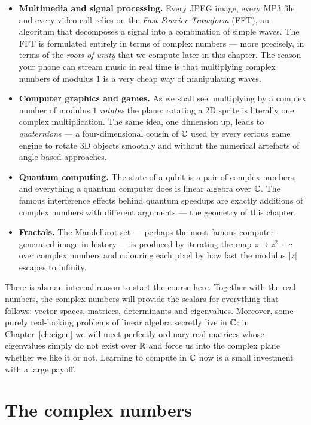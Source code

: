 \begin{itemize}
\item \textbf{Multimedia and signal processing.} Every JPEG image, every MP3 file and every video call
relies on the \emph{Fast Fourier Transform} (FFT), an algorithm that decomposes a signal into a
combination of simple waves. The FFT is formulated entirely in terms of complex numbers — more precisely,
in terms of the \emph{roots of unity} that we compute later in this chapter. The reason your phone
can stream music in real time is that multiplying complex numbers of modulus $1$ is a very cheap way of
manipulating waves.
\item \textbf{Computer graphics and games.} As we shall see, multiplying by a complex number of modulus
$1$ \emph{rotates} the plane: rotating a 2D sprite is literally one complex multiplication. The same idea,
one dimension up, leads to \emph{quaternions} — a four-dimensional cousin of $\mathbb{C}$ used by every serious
game engine to rotate 3D objects smoothly and without the numerical artefacts of angle-based approaches.
\item \textbf{Quantum computing.} The state of a qubit is a pair of complex numbers, and everything a
quantum computer does is linear algebra over $\mathbb{C}$. The famous interference effects behind quantum speedups
are exactly additions of complex numbers with different arguments — the geometry of this chapter.
\item \textbf{Fractals.} The Mandelbrot set — perhaps the most famous computer-generated image in history —
is produced by iterating the map $z\mapsto z^2+c$ over complex numbers and colouring each pixel by how fast
the modulus $|z|$ escapes to infinity.
\end{itemize}

There is also an internal reason to start the course here. Together with the real numbers, the complex
numbers will provide the scalars for everything that follows: vector spaces, matrices, determinants and
eigenvalues. Moreover, some purely
real-looking problems of linear algebra secretly live in $\mathbb{C}$: in Chapter~\ref{ch:eigen} we will meet
perfectly ordinary real matrices whose eigenvalues simply do not exist over $\mathbb{R}$ and force us into the
complex plane whether we like it or not. Learning to compute in $\mathbb{C}$ now is a small investment with a
large payoff.

\section{The complex numbers}

